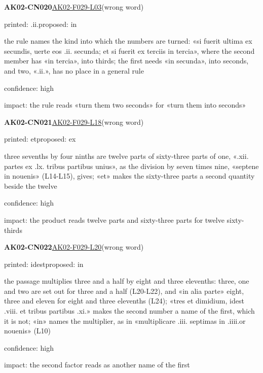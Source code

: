 \documentclass[11pt]{article}
\begin{document}
\noindent\textbf{AK02-CN020}\enspace\hyperlink{AK02-F029-L03}{AK02-F029-L03}\enspace(wrong word)\par\noindent printed: .ii.\enspace proposed: in\par\noindent the rule names the kind into which the numbers are turned: «si fuerit ultima ex secundis, uerte eos .ii. secunda; et si fuerit ex terciis in tercia», where the second member has «in tercia», into thirds; the first needs «in secunda», into seconds, and two, «.ii.», has no place in a general rule\par\noindent confidence: high\par\noindent impact: the rule reads «turn them two seconds» for «turn them into seconds»\par\medskip
\noindent\textbf{AK02-CN021}\enspace\hyperlink{AK02-F029-L18}{AK02-F029-L18}\enspace(wrong word)\par\noindent printed: et\enspace proposed: ex\par\noindent three sevenths by four ninths are twelve parts of sixty-three parts of one, «.xii. partes ex .lx. tribus partibus unius», as the division by seven times nine, «septene in nouenis» (L14-L15), gives; «et» makes the sixty-three parts a second quantity beside the twelve\par\noindent confidence: high\par\noindent impact: the product reads twelve parts and sixty-three parts for twelve sixty-thirds\par\medskip
\noindent\textbf{AK02-CN022}\enspace\hyperlink{AK02-F029-L20}{AK02-F029-L20}\enspace(wrong word)\par\noindent printed: idest\enspace proposed: in\par\noindent the passage multiplies three and a half by eight and three elevenths: three, one and two are set out for three and a half (L20-L22), and «in alia parte» eight, three and eleven for eight and three elevenths (L24); «tres et dimidium, idest .viii. et tribus partibus .xi.» makes the second number a name of the first, which it is not; «in» names the multiplier, as in «multiplicare .iii. septimas in .iiii.or nouenis» (L10)\par\noindent confidence: high\par\noindent impact: the second factor reads as another name of the first\par\medskip
\end{document}
